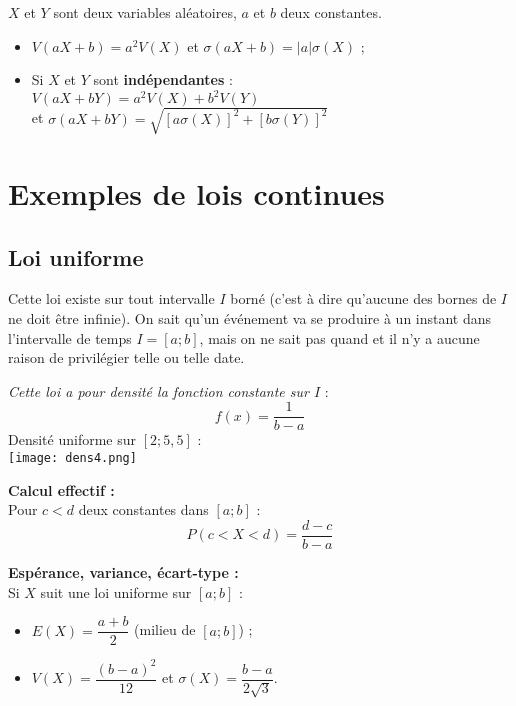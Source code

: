 \documentclass[a4paper,11pt]{article} \usepackage{FBarticle} \mapage{831}{Probabilités 2} %
\begin{document}
\begin{multicols}{2}
\prop$X$ et $Y$ sont deux variables aléatoires, $a$ et $b$ deux constantes.
 \begin{itemize}
\item $V(aX+b)=a^2V(X)$ et $\sigma(aX+b)=|a|\sigma(X)$ ;
\item Si $X$ et $Y$ sont \textbf{indépendantes} :\\
$V(aX+bY)=a^2V(X)+b^2V(Y)$ \\ et $\sigma(aX+bY)=\sqrt{[a\sigma(X)]^2+[b\sigma(Y)]^2}$
\end{itemize}


\section{Exemples de lois continues}
\subsection{Loi uniforme}
Cette loi existe sur tout intervalle $I$ borné (c'est à dire qu'aucune des bornes de $I$ ne doit être infinie). On sait qu'un événement va se produire à un instant dans l'intervalle de temps $I=[a;b]$, mais on ne sait pas quand et il n'y a aucune raison de privilégier telle ou telle date.\par

\emph{Cette loi a pour densité la fonction constante sur $I$ }:
$$f(x)=\dfrac{1}{b-a}$$
\exem Densité uniforme sur $[2;5,5]$ :\\
\texttt{[image: dens4.png]}

\prop \textbf{Calcul effectif :}\\
Pour $c<d$ deux constantes dans $[a;b]$ :\\
$$P(c<X<d)=\dfrac{d-c}{b-a}$$


\prop \textbf{Espérance, variance, écart-type :}\\
Si $X$ suit une loi uniforme sur $[a;b]$ :
\begin{itemize}
\item $E(X)=\dfrac{a+b}{2}$ (milieu de $[a;b]$) ;
\item $V(X)=\dfrac{(b-a)^2}{12}$ et $\sigma(X)=\dfrac{b-a}{2\sqrt{3}}$.\\
\end{itemize}




\end{multicols}
\end{document}
